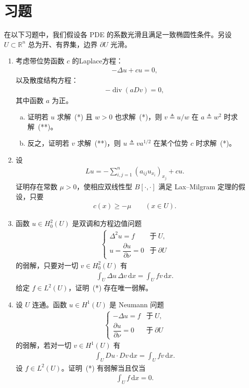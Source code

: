 \documentclass[../../main.tex]{subfiles}
\begin{document}
\section{习题}\label{section:ch06-习题}

在以下习题中，我们假设各 PDE 的系数光滑且满足一致椭圆性条件。另设 $U\subset\mathbb{R}^{n}$ 总为开、有界集，边界 $\partial U$ 光滑。

\begin{enumerate}
\item 考虑带位势函数 $c$ 的Laplace方程：
\begin{align}
-\Delta u+cu=0,
\end{align}
以及散度结构方程：
\begin{align}
-\operatorname{div}(aDv)=0,
\end{align}
其中函数 $a$ 为正。
\begin{enumerate}[(a)]
\item 证明若 $u$ 求解~(*) 且 $w>0$ 也求解~(*)，则 $v\triangleq u/w$ 在 $a\triangleq w^{2}$ 时求解~(**)。
\item 反之，证明若 $v$ 求解~(**)，则 $u\triangleq va^{1/2}$ 在某个位势 $c$ 时求解~(*)。
\end{enumerate}

\item 设
\begin{align*}
Lu=-\sum_{i,j=1}^{n}(a_{ij}u_{x_{i}})_{x_{j}}+cu.
\end{align*}
证明存在常数 $\mu>0$，使相应双线性型 $B[\cdot,\cdot]$ 满足 Lax--Milgram 定理的假设，只要
\begin{align*}
c(x)\geqslant-\mu\qquad (x\in U).
\end{align*}

\item 函数 $u\in H^{2}_{0}(U)$ 是双调和方程边值问题
\begin{align}
\begin{cases}
\Delta^{2}u=f & \text{于}\ U,\\
u=\dfrac{\partial u}{\partial\nu}=0 & \text{于}\ \partial U
\end{cases}
\end{align}
的弱解，只要对一切 $v\in H^{2}_{0}(U)$ 有
\begin{align*}
\int_{U}\Delta u\,\Delta v\,\mathrm{d}x=\int_{U}fv\,\mathrm{d}x.
\end{align*}
给定 $f\in L^{2}(U)$，证明~(*) 存在唯一弱解。

\item 设 $U$ 连通。函数 $u\in H^{1}(U)$ 是 Neumann 问题
\begin{align}
\begin{cases}
-\Delta u=f & \text{于}\ U,\\
\dfrac{\partial u}{\partial\nu}=0 & \text{于}\ \partial U
\end{cases}
\end{align}
的弱解，若对一切 $v\in H^{1}(U)$ 有
\begin{align*}
\int_{U}Du\cdot Dv\,\mathrm{d}x=\int_{U}fv\,\mathrm{d}x.
\end{align*}
设 $f\in L^{2}(U)$。证明~(*) 有弱解当且仅当
\begin{align*}
\int_{U}f\,\mathrm{d}x=0.
\end{align*}


\end{enumerate}
\end{document}
